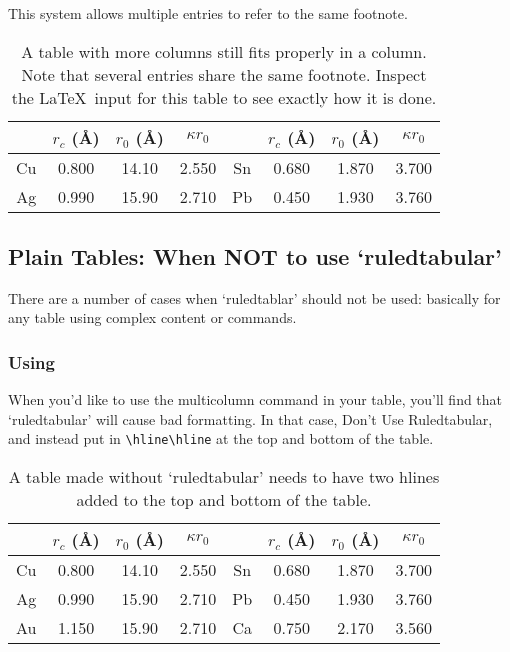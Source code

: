 This system allows
multiple entries to refer to the same
footnote.


\begin{table}[ht]
\caption{\label{tab:table1}A table with more columns still fits
properly in a column. Note that several entries share the same
footnote. Inspect the \LaTeX\ input for this table to see
exactly how it is done.}

\begin{ruledtabular}
\begin{tabular}{cccccccc}
 &$r_c$ (\AA)\footnotemark[1]&$r_0$ (\AA)&$\kappa r_0$&
 &$r_c$ (\AA) &$r_0$ (\AA)&$\kappa r_0$\\
\hline
Cu& 0.800 & 14.10 & 2.550 &Sn\footnotemark[1]
& 0.680 & 1.870 & 3.700 \\
Ag& 0.990 & 15.90 & 2.710 &Pb\footnotemark[2]
& 0.450 & 1.930 & 3.760 \\
\end{tabular}
\end{ruledtabular}
\end{table}
\clearpage
\subsection{Plain Tables: When NOT to use `ruledtabular'}
There are a number of cases when `ruledtablar' should not
be used: basically for any table using complex content or
commands.

\subsubsection{Using {\tt\string\multicolumn}}
When you'd like to use the multicolumn command in your
table, you'll find that `ruledtabular' will cause bad
formatting. In that case, Don't Use Ruledtabular, and
instead put in \verb+\hline\hline+ at the top and bottom of
the table.


\begin{table}[ht]
\caption{A table made without `ruledtabular' needs to have two hlines
added to the top and bottom of the table.}
\vskip3pt
\begin{tabular}{cccccccc}
\hline\hline
 &$r_c$ (\AA)\footnotemark[1]&$r_0$ (\AA)&$\kappa r_0$&
 &$r_c$ (\AA) &$r_0$ (\AA)&$\kappa r_0$\\
\hline
Cu& 0.800 & 14.10 & 2.550 &Sn\footnotemark[1]
& 0.680 & 1.870 & 3.700 \\
Ag& 0.990 & 15.90 & 2.710 &Pb\footnotemark[2]
& 0.450 & 1.930 & 3.760 \\
Au& 1.150 & 15.90 & 2.710 &Ca\footnotemark[3]
& 0.750 & 2.170 & 3.560\\
\hline\hline
\end{tabular}
\end{table}

